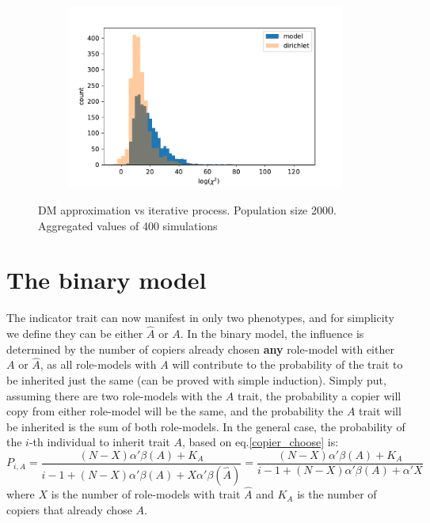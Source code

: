 \documentclass[11pt]{article}
\begin{document}
\begin{figure}[t]
\begin{center}
\begin{subfigure}[a]{0.3\textwidth}
    \end{subfigure}
    \begin{subfigure}[a]{0.3\textwidth}
    \includegraphics[width=\linewidth]{../figures/chi_square_stats/chi_hist_homogenous_J.pdf}
  \end{subfigure}
  \caption{DM approximation vs iterative process. Population size 2000. 			Aggregated values of 400 simulations}	
  \label{fig:chiSquaredHist}
  \end{center}
\end{figure}

\section{The binary model} The indicator trait can now manifest in only two phenotypes, and for simplicity we define they can be either $\hat{A}$ or $A$. In the binary model, the influence is determined by the number of copiers already chosen \textbf{any} role-model with either $A$ or $\hat{A}$, as all role-models with $A$ will contribute to the probability of the trait to be inherited just the same (can be proved with simple induction). Simply put, assuming there are two role-models with the $A$ trait, the probability a copier will copy from either role-model will be the same, and the probability the $A$ trait will be inherited is the sum of both role-models.
In the general case, the probability of the $i$-th individual to inherit trait $A$, based on eq.\ref{copier_choose} is:
\begin{equation}\label{eq:binary-model}
P_{i,A} = \frac{(N-X)\alpha'\beta(A) + K_A}{i-1 + (N-X)\alpha'\beta(A) + X\alpha'\beta(\hat{A})} = \frac{(N-X)\alpha'\beta(A) + K_A}{i-1 + (N-X)\alpha'\beta(A) + \alpha'X}
\end{equation}
where $X$ is the number of role-models with trait $\hat{A}$ and $K_A$ is the number of copiers that already chose $A$.\\
\end{document}
